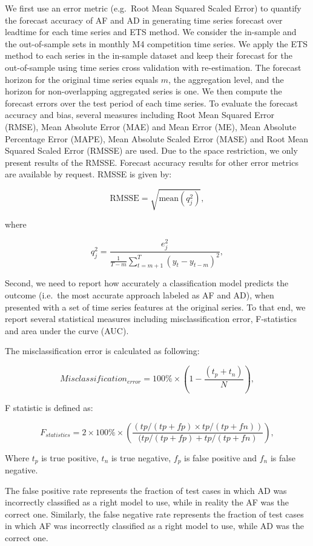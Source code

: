 \documentclass[preprint, 3p,
authoryear]{elsarticle} %
\begin{document}
We first use an error metric (e.g.~Root Mean Squared Scaled Error) to
quantify the forecast accuracy of AF and AD in generating time series
forecast over leadtime for each time series and ETS method. We consider
the in-sample and the out-of-sample sets in monthly M4 competition time
series. We apply the ETS method to each series in the in-sample dataset
and keep their forecast for the out-of-sample using time series cross
validation with re-estimation. The forecast horizon for the original
time series equals \(m\), the aggregation level, and the horizon for
non-overlapping aggregated series is one. We then compute the forecast
errors over the test period of each time series. To evaluate the
forecast accuracy and bias, several measures including Root Mean Squared
Error (RMSE), Mean Absolute Error (MAE) and Mean Error (ME), Mean
Absolute Percentage Error (MAPE), Mean Absolute Scaled Error (MASE) and
Root Mean Squared Scaled Error (RMSSE) are used. Due to the space
restriction, we only present results of the RMSSE. Forecast accuracy
results for other error metrics are available by request. RMSSE is given
by:

\[ \text{RMSSE} = \sqrt{\text{mean}(q_{j}^2)},\]

where

\[q^2_{j} = \frac{\displaystyle e^2_{j}}
    {\displaystyle\frac{1}{T-m}\sum_{t=m+1}^T (y_{t}-y_{t-m})^2},\]

Second, we need to report how accurately a classification model predicts
the outcome (i.e.~the most accurate approach labeled as AF and AD), when
presented with a set of time series features at the original series. To
that end, we report several statistical measures including
misclassification error, F-statistics and area under the curve (AUC).

The misclassification error is calculated as following:

\[Misclassification_{error} = 100\% \times \left( 1-\frac{(t_p+t_n)}{N}\right),\]

F statistic is defined as:

\[F_{statistics} = 2 \times 100\% \times \left(\frac{(tp/(tp+fp) \times tp/(tp+fn))}{(tp/(tp+fp)+tp/(tp+fn)}\right),\]

Where \(t_p\) is true positive, \(t_n\) is true negative, \(f_p\) is
false positive and \(f_n\) is false negative.

The false positive rate represents the fraction of test cases in which
AD was incorrectly classified as a right model to use, while in reality
the AF was the correct one. Similarly, the false negative rate
represents the fraction of test cases in which AF was incorrectly
classified as a right model to use, while AD was the correct one.
\end{document}
